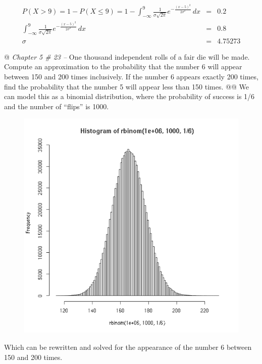 \documentclass[10pt]{article}
\begin{document}
\begin{easylist}[enumerate]
    \[
        \begin{aligned}
            P(X > 9) = 1 - P(X \le 9) =
            1 - \int^9_{-\infty} \frac{1}{\sigma\sqrt{2\pi} } e^{-\frac{(x-5)^2}{2\sigma^2} } \, dx &=& 0.2\\
            \int^9_{-\infty} \frac{1}{\sigma\sqrt{2\pi} } e^{-\frac{(x-5)^2}{2\sigma^2} } \, dx &=& 0.8\\
            \sigma &=& \boxed{4.75273}
        \end{aligned}
    \]

    @ \textit{Chapter 5 \# 23 --} One thousand independent rolls of a fair die will be made. Compute an approximation to
    the probability that the number 6 will appear between 150 and 200 times inclusively. If the number 6 appears exactly
    200 times, find the probability that the number 5 will appear less than 150 times.
    @@ We can model this as a binomial distribution, where the probability of success is 1/6 and the number of ``flips''
    is 1000.

    \begin{figure}[!ht]
        \centering
        \includegraphics[scale=0.5]{./img/binomial0.png}
    \end{figure}

    Which can be rewritten and solved for the appearance of the number 6 between 150 and 200 times.


\end{easylist}
\end{document}
